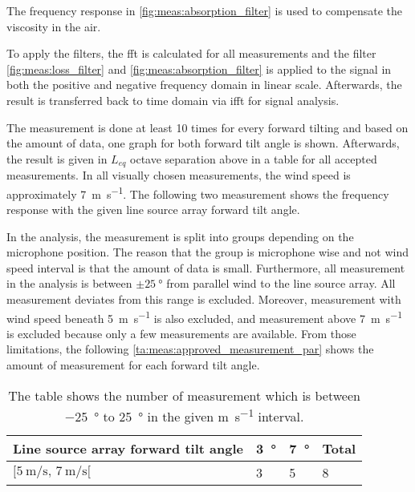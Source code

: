  
The frequency response in \autoref{fig:meas:absorption_filter} is used to compensate the viscosity in the air. 

To apply the filters, the \gls{fft} is calculated for all measurements and the filter  \autoref{fig:meas:loss_filter} and \autoref{fig:meas:absorption_filter} is applied to the signal in both the positive and negative frequency domain in linear scale. Afterwards, the result is transferred back to time domain via \gls{ifft} for signal analysis.  

The measurement is done at least 10 times for every forward tilting and based on the amount of data, one graph for both forward tilt angle is shown. Afterwards, the result is given in $L_{eq}$ octave separation above  in a table for all accepted measurements. In all visually chosen measurements, the wind speed is approximately \SI{7}{\meter\per\second}. The following two measurement shows the frequency response with the given line source array forward tilt angle. 
   

In the analysis, the measurement is split into groups depending on the microphone position. The reason that the group is microphone wise and not wind speed interval is that the amount of data is small. Furthermore, all measurement in the analysis is between $\pm\SI{25}{\degree}$ from parallel wind to the line source array.  All measurement deviates from this range is excluded. Moreover, measurement with wind speed beneath \SI{5}{\meter\per\second} is also excluded, and measurement above \SI{7}{\meter\per\second} is excluded because only a few measurements are available.  From those limitations, the following \autoref{ta:meas:approved_measurement_par} shows the amount of measurement for each forward tilt angle. 

\begin{table}[H]
\centering
\caption{The table shows the number of measurement which is between \SI{-25}{\degree} to \SI{25}{\degree} in the given \si{\meter\per\second} interval.}
\begin{tabular}{l|l|l|l}
Line source array forward tilt angle & \SI{3}{\degree}  & \SI{7}{\degree} & Total \\ \hline
$[\SI{5}{\meter\per\second},\, \SI{7}{\meter\per\second}[  $        & 3  & 5  & 8     \\      
\end{tabular}
\label{ta:meas:approved_measurement_par}
\end{table}

